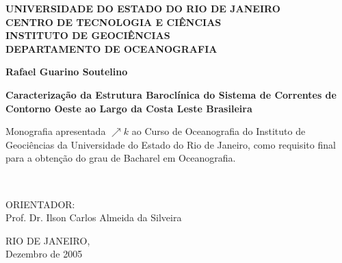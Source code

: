 \documentclass[12pt,portuguese,a4paper,pdftex]{article}
\renewcommand{\baselinestretch}{1.5}
\begin{document}
\begin{titlepage}


\begin{center}
{\large \bf UNIVERSIDADE DO ESTADO DO RIO DE JANEIRO\\
\vspace{-0.3cm}
CENTRO DE TECNOLOGIA E CI\^ENCIAS\\
\vspace{-0.3cm}
INSTITUTO DE GEOCI\^ENCIAS\\
\vspace{-0.3cm}
DEPARTAMENTO DE OCEANOGRAFIA\\} 
\end{center}

\vspace{3cm}

\begin{center}
{\large \bf Rafael Guarino Soutelino\\} 
\end{center}

\vspace{2cm}

\begin{center}

{\LARGE \bf \sc Caracteriza\c c\~ao da Estrutura Barocl\'inica do Sistema de Correntes de Contorno Oeste 
ao Largo da Costa Leste Brasileira}\\

\end{center}
\renewcommand{\baselinestretch}{1.2}

\vspace{2cm}

\hspace{2.5in}
\parbox[t][2.0in][t]{3.7in}{\small Monografia apresentada $\nearrow{k}$ ao Curso de Oceanografia do Instituto de Geociências
da Universidade do Estado do Rio de Janeiro, como requisito final para a
obtenção do grau de Bacharel em Oceanografia.}\\

\vspace{-2cm}

\begin{center}
{ORIENTADOR:\\
Prof. Dr. Ilson Carlos Almeida da Silveira}
\end{center}

\vspace{2cm}

\begin{center}
{\small RIO DE JANEIRO, \\
Dezembro de 2005}
\end{center}
\end{titlepage}
\end{document}
